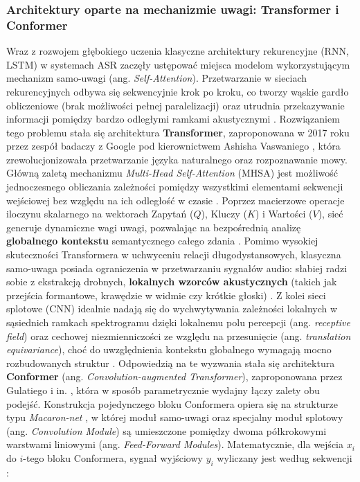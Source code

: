 \subsubsection{Architektury oparte na mechanizmie uwagi: Transformer i Conformer}
\label{subsec:transformer_conformer}
Wraz z rozwojem głębokiego uczenia klasyczne architektury rekurencyjne (RNN, LSTM) w systemach ASR zaczęły ustępować miejsca modelom wykorzystującym mechanizm samo-uwagi (ang. \textit{Self-Attention}). Przetwarzanie w sieciach rekurencyjnych odbywa się sekwencyjnie krok po kroku, co tworzy wąskie gardło obliczeniowe (brak możliwości pełnej paralelizacji) oraz utrudnia przekazywanie informacji pomiędzy bardzo odległymi ramkami akustycznymi \cite[s.~315]{pondel2024e2e}. Rozwiązaniem tego problemu stała się architektura \textbf{Transformer}, zaproponowana w 2017 roku przez zespół badaczy z Google pod kierownictwem Ashisha Vaswaniego \cite{vaswani2017attention}, która zrewolucjonizowała przetwarzanie języka naturalnego oraz rozpoznawanie mowy. Główną zaletą mechanizmu \textit{Multi-Head Self-Attention} (MHSA) jest możliwość jednoczesnego obliczania zależności pomiędzy wszystkimi elementami sekwencji wejściowej bez względu na ich odległość w czasie \cite[s.~178--179]{jurafsky2026}. Poprzez macierzowe operacje iloczynu skalarnego na wektorach Zapytań ($Q$), Kluczy ($K$) i Wartości ($V$), sieć generuje dynamiczne wagi uwagi, pozwalając na bezpośrednią analizę \textbf{globalnego kontekstu} semantycznego całego zdania \cite[s.~189--191]{jurafsky2026}. Pomimo wysokiej skuteczności Transformera w uchwyceniu relacji długodystansowych, klasyczna samo-uwaga posiada ograniczenia w przetwarzaniu sygnałów audio: słabiej radzi sobie z ekstrakcją drobnych, \textbf{lokalnych wzorców akustycznych} (takich jak przejścia formantowe, krawędzie w widmie czy krótkie głoski) \cite[s.~1]{gulati2020conformer}. Z kolei sieci splotowe (CNN) idealnie nadają się do wychwytywania zależności lokalnych w sąsiednich ramkach spektrogramu dzięki lokalnemu polu percepcji (ang. \textit{receptive field}) \cite[s.~362--363]{jurafsky2026} oraz cechowej niezmienniczości ze względu na przesunięcie (ang. \textit{translation equivariance}), choć do uwzględnienia kontekstu globalnego wymagają mocno rozbudowanych struktur \cite[s.~1]{gulati2020conformer}. Odpowiedzią na te wyzwania stała się architektura \textbf{Conformer} (ang. \textit{Convolution-augmented Transformer}), zaproponowana przez Gulatiego i in. \cite{gulati2020conformer}, która w sposób parametrycznie wydajny łączy zalety obu podejść. Konstrukcja pojedynczego bloku Conformera opiera się na strukturze typu \textit{Macaron-net} \cite[s.~2]{gulati2020conformer}, w której moduł samo-uwagi oraz specjalny moduł splotowy (ang. \textit{Convolution Module}) są umieszczone pomiędzy dwoma półkrokowymi warstwami liniowymi (ang. \textit{Feed-Forward Modules}). Matematycznie, dla wejścia $x_i$ do $i$-tego bloku Conformera, sygnał wyjściowy $y_i$ wyliczany jest według sekwencji \cite[s.~2, wzór (1)]{gulati2020conformer}:
